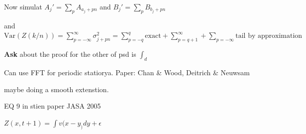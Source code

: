 \documentclass[answers,12pt,addpoints]{exam}
\begin{document}
Now simulat $A_j' = \sum_p A_{a_j+pn}$ and $B_j' = \sum_p B_{b_j+pn}$

and $\text{Var}(Z(k/n)) = \sum_{p = -\infty}^{\infty} \sigma^2_{j+pn} = \sum_{p=-q}^{q} \text{exact} + \sum_{p=q+1}^{\infty} + \sum_{p=-\infty} \text{tail by approximation}$


\textbf{Ask} about the proof for the other of psd is $\int_d$

Can use FFT for periodic statiorya. Paper: Chan \& Wood, Deitrich \& Neuwsam

maybe doing a smooth extenstion.

EQ 9 in stien paper JASA 2005

$Z(x,t+1) = \int v(x-y_) dy + \epsilon$
\end{document}
